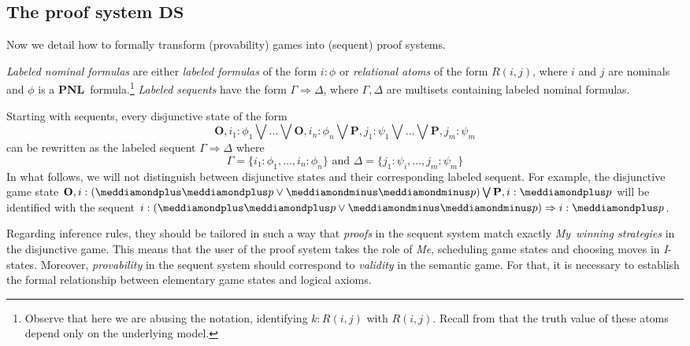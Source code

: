 \documentclass{easychair}
\newcommand{\I}{\emph{I}\xspace}
\newcommand{\My}{\emph{My}\xspace}
\newcommand{\Me}{\emph{Me}\xspace}
\newcommand{\DS}{\mathbf{DS}}
\newcommand{\seq}{\Rightarrow}
\newcommand{\dplus}{\meddiamondplus}
\newcommand{\dminus}{\meddiamondminus}
\newcommand{\PNL}{\textbf{PNL}}
\begin{document}
 

\subsection{The proof system $\DS$}\label{sec:seq-system}

Now we detail how to formally transform (provability) games into (sequent) proof systems. 




{\em Labeled nominal formulas} are either \emph{labeled formulas} of
the form $i:\phi$ or \emph{relational atoms} of the form $R(i,j)$,
where $i$ and $j$ are nominals and $\phi$ is a \PNL~formula.\footnote{Observe that here we are abusing the notation, identifying $k:R(i,j)$ with $R(i,j)$. Recall from  that the truth value of  these atoms depend only on the underlying model.} \emph{Labeled sequents} have the form $\Gamma \seq \Delta$, where
$\Gamma,\Delta$ are multisets containing labeled nominal formulas.

Starting with sequents, every disjunctive state of the form
\[
\mathbf{O},i_1: \phi_1\bigvee \ldots \bigvee \mathbf{O},i_n: \phi_n\bigvee\mathbf{P},j_1: \psi_1 \bigvee \ldots \bigvee \mathbf{P},j_m: \psi_m
\]
 can be rewritten as the labeled sequent $\Gamma \seq \Delta$ where
\[
\Gamma =\{i_1: \phi_1, \ldots, i_n: \phi_n\}\mbox{ and } \Delta =\{j_1: \psi_i,\ldots,j_m: \psi_m\}
\] 
In what follows, we will not distinguish between disjunctive states and their corresponding labeled sequent. For example,
the disjunctive game state
$\mathbf{O},i:(\dplus\dplus p \vee \dminus\dminus p)\bigvee\mathbf{P},i: \dplus p$
will be identified with the sequent  
$i:(\dplus\dplus p \vee \dminus\dminus p)\seq i: \dplus p$.

Regarding inference rules, they should be tailored in such a way that {\em
proofs} in the sequent system match exactly \My\  {\em winning strategies} in
the disjunctive game. This means that the user of the proof system takes the
role of \Me, scheduling game states and choosing moves in \I-states. 
Moreover, {\em provability} in the sequent system should correspond to {\em
validity} in the semantic game. For that,  it is necessary to establish the
formal relationship between elementary game states and logical axioms.
\end{document}
